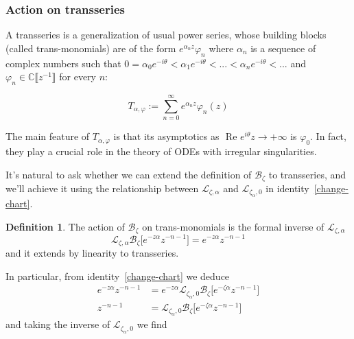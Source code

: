 \documentclass{article}
\newcommand{\C}{\mathbb{C}}
\newcommand{\laplace}{\mathcal{L}}
\newcommand{\borel}{\mathcal{B}}
\theoremstyle{definition}
\newtheorem{definition}{Definition}[section]
\theoremstyle{plain}
\begin{document}
\subsubsection{Action on transseries}\label{sec:action_transseries}

A transseries is a generalization of usual power series, whose building blocks (called trans-monomials) are of the form $e^{\alpha_n z}\varphi_n$ where $\alpha_n$ is a sequence of complex numbers such that $0=\alpha_0 e^{-i\theta}< \alpha_1 e^{-i\theta}<...<\alpha_n e^{-i\theta}<...$ and $\varphi_n\in\C\llbracket z^{-1}\rrbracket$ for every $n$: 

\[T_{\alpha,\varphi}:=\sum_{n=0}^{\infty} e^{\alpha_n z} \varphi_n(z) \]

The main feature of $T_{\alpha,\varphi}$ is that its asymptotics as $\text{ Re } e^{i\theta}z \to +\infty$ is $\varphi_0$. In fact, they play a crucial role in the theory of ODEs with irregular singularities. 

It's natural to ask whether we can extend the definition of $\borel_\zeta$ to transseries, and we'll achieve it using the relationship between $\laplace_{\zeta, \alpha}$ and $\laplace_{\zeta_\alpha, 0}$ in identity~\eqref{change-chart}. 
\begin{definition}
    The action of $\borel_\zeta$ on trans-monomials is the formal inverse of $\laplace_{\zeta,\alpha}$
    \[\laplace_{\zeta,\alpha}\borel_\zeta\big[e^{-z\alpha}z^{-n-1}\big]=e^{-z\alpha}z^{-n-1}\]
    and it extends by linearity to transseries. 
\end{definition}
In particular, from identity~\eqref{change-chart} we deduce 
\begin{align*}
    e^{-z\alpha}z^{-n-1}&=e^{-z\alpha}\laplace_{\zeta_\alpha,0}\borel_\zeta\big[e^{-\zeta\alpha}z^{-n-1}\big]\\
     z^{-n-1}&=\laplace_{\zeta_\alpha,0}\borel_\zeta\big[e^{-\zeta\alpha}z^{-n-1}\big]
\end{align*}
and taking the inverse of $\laplace_{\zeta_\alpha,0}$ we find
\end{document}
